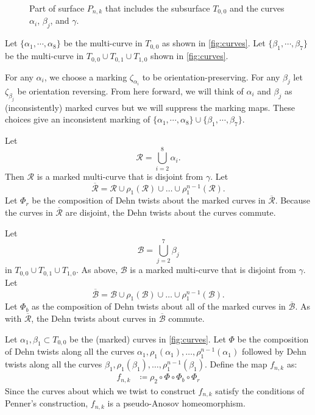 \begin{figure}[t]
    \centering
    \caption{Part of surface $P_{n,k}$ that includes the subsurface $T_{0,0}$ and the curves $\alpha_i$, $\beta_j$, and $\gamma$.}
    \label{fig:curves}
\end{figure}


Let $\{\alpha_1,\cdots,\alpha_8\}$ be the multi-curve in $T_{0,0}$ as shown in \autoref{fig:curves}.  Let $\{\beta_1,\cdots,\beta_7\}$ be the multi-curve in $T_{0,0}\cup T_{0,1}\cup T_{1,0}$ shown in \autoref{fig:curves}.

For any $\alpha_i$, we choose a marking $\zeta_{\alpha_i}$ to be orientation-preserving.  For any $\beta_j$ let $\zeta_{\beta_j}$ be
orientation reversing. From here forward, we will think of $\alpha_i$ and $\beta_j$ as (inconsistently) marked curves but we will suppress the marking maps. These choices give an inconsistent marking of $\{\alpha_1,\cdots,\alpha_8\}\cup\{\beta_1,\cdots,\beta_7\}$.

Let
$$\mathcal{R}=\displaystyle\bigcup_{i=2}^8\alpha_i.$$ Then $\mathcal{R}$ is a marked multi-curve that is disjoint from $\gamma$.  Let
$$\overline{\mathcal{R}}= \mathcal{R} \cup \rho_1(\mathcal{R}) \cup \dots \cup
\rho_1^{n-1}(\mathcal{R}).$$
Let $\Phi_r$ be the composition of Dehn twists about the marked curves in $\overline{\mathcal{R}}$.  Because the curves in $\overline{\mathcal{R}}$ are disjoint, the Dehn twists about the curves commute.

Let $$\mathcal{B}=\displaystyle\bigcup_{j=2}^7\beta_j$$ in $T_{0,0} \cup T_{0,1} \cup T_{1,0}$. As above, $\mathcal{B}$ is a marked multi-curve that is disjoint from $\gamma$.  Let $$\overline{\mathcal{B}} = \mathcal{B} \cup \rho_1(\mathcal{B}) \cup \dots \cup
\rho_1^{n-1}(\mathcal{B}).$$
Let $\Phi_b$
as the composition of Dehn twists about all of the marked curves in $\overline{\mathcal{B}}$.
As with $\overline{\mathcal{R}}$, the Dehn twists about curves in $\overline{\mathcal{B}}$
commute.

Let $\alpha_1,\beta_1 \subset T_{0,0}$ be the (marked) curves in \autoref{fig:curves}. Let $\Phi$ be the composition
of Dehn twists along all the curves $\alpha_1, \rho_1(\alpha_1), \dots, \rho_1^{n-1}(\alpha_1)$ followed by
Dehn twists along all the curves $\beta_1,\rho_1(\beta_1),\dots,\rho_1^{n-1}(\beta_1)$. Define the map $f_{n,k}$
as:
\begin{align*}
    f_{n,k} &\coloneqq \rho_2 \circ \Phi \circ \Phi_b \circ \Phi_r
\end{align*}
Since the curves about which we twist to construct $f_{n,k}$ satisfy the conditions of Penner's construction, $f_{n,k}$ is a pseudo-Anosov homeomorphism.

